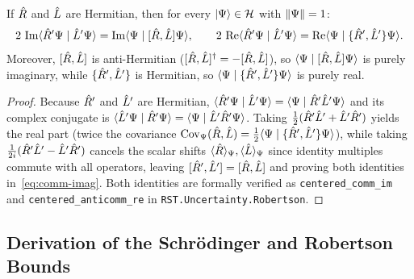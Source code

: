 \begin{lemma}
\label{lem:comm-antiherm}
If $\hat{R}$ and $\hat{L}$ are Hermitian, then for every $\lvert \Psi \rangle \in \mathcal{H}$ with $\lVert \Psi \rVert = 1$:
\begin{equation}
  2\,\operatorname{Im}\langle \hat{R}'\Psi \mid \hat{L}'\Psi \rangle = \operatorname{Im}\langle \Psi \mid [\hat{R}, \hat{L}]\Psi \rangle,
  \qquad
  2\,\operatorname{Re}\langle \hat{R}'\Psi \mid \hat{L}'\Psi \rangle = \operatorname{Re}\langle \Psi \mid \{\hat{R}',\hat{L}'\}\Psi \rangle.
  \label{eq:comm-imag}
\end{equation}
Moreover, $[\hat{R}, \hat{L}]$ is anti-Hermitian ($[\hat{R}, \hat{L}]^\dagger = -[\hat{R}, \hat{L}]$),
so $\langle \Psi \mid [\hat{R}, \hat{L}]\Psi \rangle$ is purely imaginary, while $\{\hat{R}',\hat{L}'\}$ is
Hermitian, so $\langle \Psi \mid \{\hat{R}',\hat{L}'\}\Psi \rangle$ is purely real.
\end{lemma}
\begin{proof}
Because $\hat{R}'$ and $\hat{L}'$ are Hermitian, $\langle \hat{R}'\Psi \mid \hat{L}'\Psi \rangle = \langle \Psi \mid \hat{R}'\hat{L}'\Psi \rangle$
and its complex conjugate is $\langle \hat{L}'\Psi \mid \hat{R}'\Psi \rangle = \langle \Psi \mid \hat{L}'\hat{R}'\Psi \rangle$.
Taking $\frac{1}{2}(\hat{R}'\hat{L}' + \hat{L}'\hat{R}')$ yields the real part (twice the covariance
$\mathrm{Cov}_\Psi(\hat{R},\hat{L}) = \frac{1}{2}\langle \Psi \mid \{\hat{R}',\hat{L}'\}\Psi \rangle$), while
taking $\frac{1}{2i}(\hat{R}'\hat{L}' - \hat{L}'\hat{R}')$ cancels the scalar shifts $\langle \hat{R} \rangle_{\Psi},
\langle \hat{L} \rangle_{\Psi}$ since identity multiples commute with all operators, leaving
$[\hat{R}', \hat{L}'] = [\hat{R}, \hat{L}]$ and proving both identities in~\eqref{eq:comm-imag}.
Both identities are formally verified as \texttt{centered\_\allowbreak{}comm\_im} and
\texttt{centered\_\allowbreak{}anticomm\_re} in \texttt{RST.Uncertainty.\allowbreak{}Robertson}.
\end{proof}

\subsection{Derivation of the Schr\"odinger and Robertson Bounds}
\label{subsec:unc-derivation}

